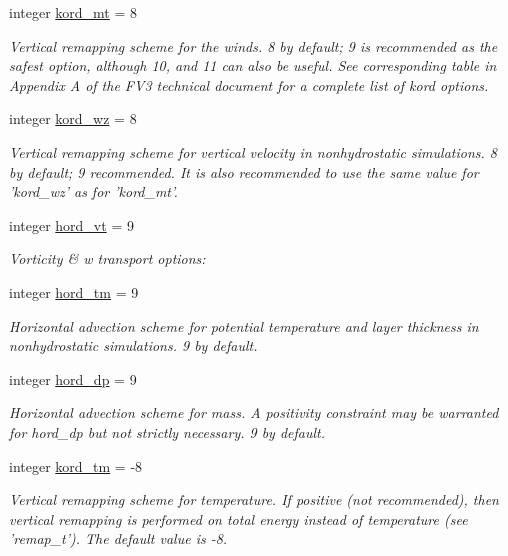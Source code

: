 \begin{DoxyCompactItemize}
integer \hyperlink{structfv__arrays__mod_1_1fv__flags__type_aac512996328887adf30b7db1c7235de2}{kord\-\_\-mt} = 8
\begin{DoxyCompactList}\small\item\em Vertical remapping scheme for the winds. 8 by default; 9 is recommended as the safest option, although 10, and 11 can also be useful. See corresponding table in Appendix A of the F\-V3 technical document for a complete list of kord options. \end{DoxyCompactList}\item 
integer \hyperlink{structfv__arrays__mod_1_1fv__flags__type_a956b1eda2db234dc8646d547c3197c81}{kord\-\_\-wz} = 8
\begin{DoxyCompactList}\small\item\em Vertical remapping scheme for vertical velocity in nonhydrostatic simulations. 8 by default; 9 recommended. It is also recommended to use the same value for 'kord\-\_\-wz' as for 'kord\-\_\-mt'. \end{DoxyCompactList}\item 
integer \hyperlink{structfv__arrays__mod_1_1fv__flags__type_adfb527dd9d1387bc79c721bc9810c410}{hord\-\_\-vt} = 9
\begin{DoxyCompactList}\small\item\em Vorticity \& w transport options\-: \end{DoxyCompactList}\item 
integer \hyperlink{structfv__arrays__mod_1_1fv__flags__type_aec43383385030681d8c19c8e906adc1e}{hord\-\_\-tm} = 9
\begin{DoxyCompactList}\small\item\em Horizontal advection scheme for potential temperature and layer thickness in nonhydrostatic simulations. 9 by default. \end{DoxyCompactList}\item 
integer \hyperlink{structfv__arrays__mod_1_1fv__flags__type_a65a2e3ed85e51cb3b2245e3f36bf8391}{hord\-\_\-dp} = 9
\begin{DoxyCompactList}\small\item\em Horizontal advection scheme for mass. A positivity constraint may be warranted for hord\-\_\-dp but not strictly necessary. 9 by default. \end{DoxyCompactList}\item 
integer \hyperlink{structfv__arrays__mod_1_1fv__flags__type_a97fa1725f727c163a6a90457a32c717c}{kord\-\_\-tm} = -\/8
\begin{DoxyCompactList}\small\item\em Vertical remapping scheme for temperature. If positive (not recommended), then vertical remapping is performed on total energy instead of temperature (see 'remap\-\_\-t'). The default value is -\/8. \end{DoxyCompactList}\item 

\end{DoxyCompactItemize}

